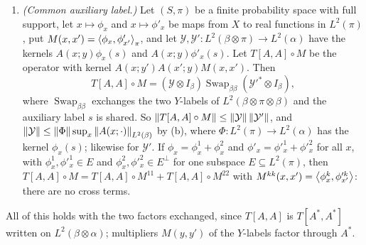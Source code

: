 \begin{lemma}
\begin{enumerate}[label=\textup{(\alph*)}]
  on $\Fp$ and $e_0(a,s)=(p\one_{a=s}-1)/\sqrt{p-1}$. Then $e_0$ is a unit vector
  of $\mathcal H\otimes\mathcal H$, and if $e_0\otimes I\colon\mathcal H\to
  \mathcal H^{\otimes3}$ maps $h$ to $e_0\otimes h$ and
  $\operatorname{Swap}_{13}$ exchanges the first and the third factor, then
  $(e_0\otimes I)^*\operatorname{Swap}_{13}(e_0\otimes I)=I/(p-1)$ on
  $\mathcal H$.
\item \emph{(Common auxiliary label.)} Let $(S,\pi)$ be a finite probability space with
  full support, let $x\mapsto\phi_x$ and $x\mapsto\phi'_x$ be maps from $X$ to
  real functions in $L^2(\pi)$, put $M(x,x')=\left\langle \phi_x,\phi'_{x'}\right\rangle_\pi$, and
  let $\mathcal Y,\mathcal Y'\colon L^2(\beta\otimes\pi)\to L^2(\alpha)$ have the
  kernels $A(x;y)\phi_x(s)$ and $A(x;y)\phi'_x(s)$. Let $T[A,A]\circ M$ be the
  operator with kernel $A(x;y')A(x';y)M(x,x')$. Then
  \[
    T[A,A]\circ M=(\mathcal Y\otimes I_\beta)\operatorname{Swap}_{\beta\beta}
    (\mathcal Y'^*\otimes I_\beta),
  \]
  where $\operatorname{Swap}_{\beta\beta}$ exchanges the two $Y$-labels of
  $L^2(\beta\otimes\pi\otimes\beta)$ and the auxiliary label $s$ is shared. So
  $\left\|T[A,A]\circ M\right\|\le\left\|\mathcal Y\right\|\left\|\mathcal Y'\right\|$, and
  $\left\|\mathcal Y\right\|\le\left\|\Phi\right\|\sup_x\left\|A(x;\cdot)\right\|_{L^2(\beta)}$ by (b),
  where $\Phi\colon L^2(\pi)\to L^2(\alpha)$ has the kernel $\phi_x(s)$; likewise
  for $\mathcal Y'$. If $\phi_x=\phi^1_x+\phi^2_x$ and
  $\phi'_x=\phi'^1_x+\phi'^2_x$ for all $x$, with $\phi^1_x,\phi'^1_x\in E$ and
  $\phi^2_x,\phi'^2_x\in E^\perp$ for one subspace $E\subseteq L^2(\pi)$, then
  $T[A,A]\circ M=T[A,A]\circ M^{11}+T[A,A]\circ M^{22}$ with
  $M^{kk}(x,x')=\left\langle \phi^k_x,\phi'^k_{x'}\right\rangle$: there are no cross terms.
\end{enumerate}
All of this holds with the two factors exchanged, since $T[A,A]$ is
$T[A^*,A^*]$ written on $L^2(\beta\otimes\alpha)$; multipliers $M(y,y')$ of the
$Y$-labels factor through $A^*$.
\end{lemma}

